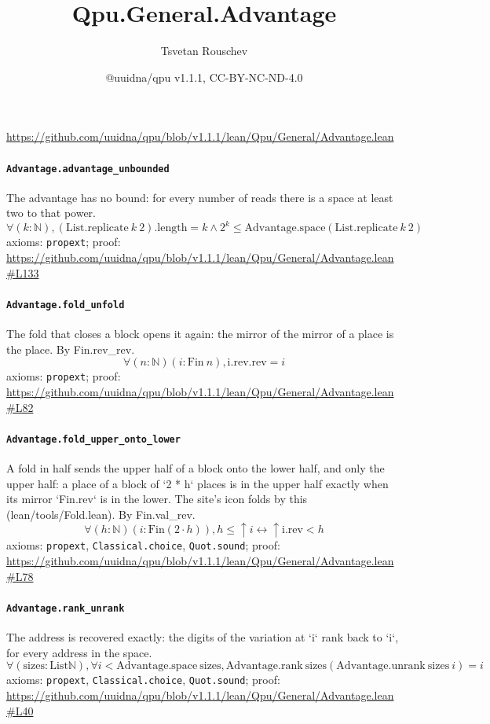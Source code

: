 \documentclass[11pt]{article}
\title{Qpu.General.Advantage}
\author{Tsvetan Rouschev}
\date{@uuidna/qpu v1.1.1, CC-BY-NC-ND-4.0}
\begin{document}
\maketitle
\noindent\url{https://github.com/uuidna/qpu/blob/v1.1.1/lean/Qpu/General/Advantage.lean}

\paragraph{\texttt{Advantage.advantage\_unbounded}}
The advantage has no bound: for every number of reads there is a space at least two to that power.
\[ \forall (k : \mathbb{N}), (\mathrm{List.replicate}\ k\ 2)\mathrm{.length} = k \land 2 ^{k} \le \mathrm{Advantage.space} (\mathrm{List.replicate}\ k\ 2) \]
\noindent axioms: \texttt{propext}; proof: \url{https://github.com/uuidna/qpu/blob/v1.1.1/lean/Qpu/General/Advantage.lean\#L133}

\paragraph{\texttt{Advantage.fold\_unfold}}
The fold that closes a block opens it again: the mirror of the mirror of a place is the place. By Fin.rev\_rev.
\[ \forall (n : \mathbb{N}) (i : \mathrm{Fin}\ n), \mathrm{i.rev.rev} = i \]
\noindent axioms: \texttt{propext}; proof: \url{https://github.com/uuidna/qpu/blob/v1.1.1/lean/Qpu/General/Advantage.lean\#L82}

\paragraph{\texttt{Advantage.fold\_upper\_onto\_lower}}
A fold in half sends the upper half of a block onto the lower half, and only the upper half: a place of a block of `2 * h` places is in the upper half exactly when its mirror `Fin.rev` is in the lower. The site's icon folds by this (lean/tools/Fold.lean). By Fin.val\_rev.
\[ \forall (h : \mathbb{N}) (i : \mathrm{Fin} (2 \cdot h)), h \le \uparrow i \leftrightarrow \uparrow \mathrm{i.rev} < h \]
\noindent axioms: \texttt{propext}, \texttt{Classical.choice}, \texttt{Quot.sound}; proof: \url{https://github.com/uuidna/qpu/blob/v1.1.1/lean/Qpu/General/Advantage.lean\#L78}

\paragraph{\texttt{Advantage.rank\_unrank}}
The address is recovered exactly: the digits of the variation at `i` rank back to `i`, for every address in the space.
\[ \forall (\mathrm{sizes} : \mathrm{List} \mathbb{N}), \forall i < \mathrm{Advantage.space}\ \mathrm{sizes}, \mathrm{Advantage.rank}\ \mathrm{sizes} (\mathrm{Advantage.unrank}\ \mathrm{sizes}\ i) = i \]
\noindent axioms: \texttt{propext}, \texttt{Classical.choice}, \texttt{Quot.sound}; proof: \url{https://github.com/uuidna/qpu/blob/v1.1.1/lean/Qpu/General/Advantage.lean\#L40}
\end{document}
